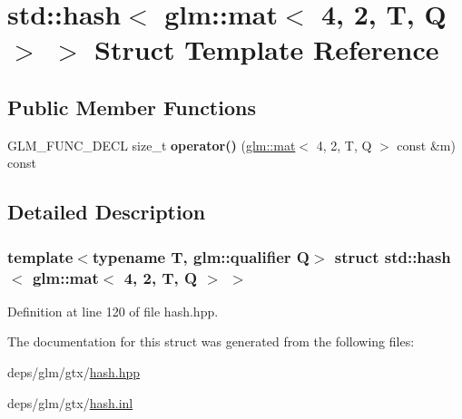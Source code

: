 \hypertarget{structstd_1_1hash_3_01glm_1_1mat_3_014_00_012_00_01T_00_01Q_01_4_01_4}{}\section{std\+:\+:hash$<$ glm\+:\+:mat$<$ 4, 2, T, Q $>$ $>$ Struct Template Reference}
\label{structstd_1_1hash_3_01glm_1_1mat_3_014_00_012_00_01T_00_01Q_01_4_01_4}
\subsection*{Public Member Functions}
\begin{DoxyCompactItemize}
\item 
\mbox{\label{structstd_1_1hash_3_01glm_1_1mat_3_014_00_012_00_01T_00_01Q_01_4_01_4_a3810f6d4161aceff24f068b30983d8df}} 
G\+L\+M\+\_\+\+F\+U\+N\+C\+\_\+\+D\+E\+CL size\+\_\+t {\bfseries operator()} (\hyperlink{structglm_1_1mat}{glm\+::mat}$<$ 4, 2, T, Q $>$ const \&m) const
\end{DoxyCompactItemize}


\subsection{Detailed Description}
\subsubsection*{template$<$typename T, glm\+::qualifier Q$>$\newline
struct std\+::hash$<$ glm\+::mat$<$ 4, 2, T, Q $>$ $>$}



Definition at line 120 of file hash.\+hpp.



The documentation for this struct was generated from the following files\+:\begin{DoxyCompactItemize}
\item 
deps/glm/gtx/\hyperlink{hash_8hpp}{hash.\+hpp}\item 
deps/glm/gtx/\hyperlink{hash_8inl}{hash.\+inl}\end{DoxyCompactItemize}
